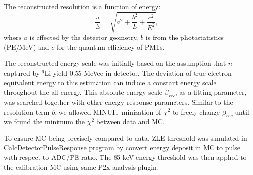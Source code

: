 \label{sec:resolution}
The reconstructed resolution is a function of energy:
\begin{equation}
\label{eql:resolution}
    \frac{\sigma}{E} = \sqrt{a^2 + \frac{b^2}{E}+\frac{c^2}{E^2}},
\end{equation}
where $a$ is affected by the detector geometry, $b$ is from the photostatistics (PE/MeV) and $c$ for the quantum efficiency of PMTs.


\label{sec:other}
The reconstructed energy scale was initially based on the assumption that $n$ captured by $^6$Li yield 0.55 MeVee in detector. 
The deviation of true electron equivalent energy to this estimation can induce a constant energy scale throughout the all energy. 
This absolute energy scale $\beta_{rec}$, as a fitting parameter, was searched together with other energy response parameters.
Similar to the resolution term $b$, we allowed MINUIT minization of $\chi^2$ to freely change $\beta_{rec}$ until we found the minimum the $\chi^2$ between data and MC.

To ensure MC being precisely compared to data, ZLE threshold was simulated in CalcDetectorPulseResponse program by convert energy deposit in MC to pulse with respect to ADC/PE ratio.
The 85 keV energy threshold was then applied to the calibration MC using same P2x analysis plugin.

